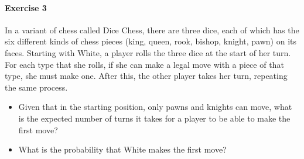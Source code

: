\documentclass[a4paper,12pt]{article}
\begin{document}
\paragraph{Exercise 3}  In a variant of chess called Dice Chess, there are three dice, each of which has the six different kinds of chess pieces (king, queen, rook, bishop, knight, pawn) on its faces. Starting with White, a player rolls the three dice at the start of her turn. For each type that she rolls, if she can make a legal move with a piece of that type, she must make one. After this, the other player takes her turn, repeating the same process.
\begin{itemize}
	\item[(a)] Given that in the starting position, only pawns and knights can move, what is the expected number of turns it takes for a player to be able to make the first move?
	\item[(b)] What is the probability that White makes the first move?
\end{itemize}
\end{document}
